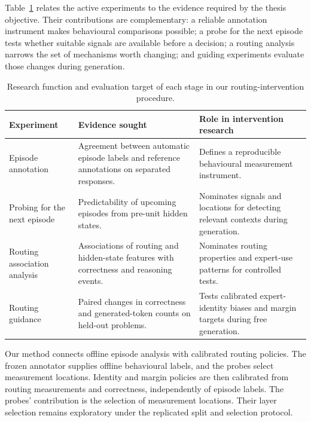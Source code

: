 \documentclass[12pt,a4paper,twoside,openright]{book}
\begin{document}
Table~\ref{tab:active-experiment-roles} relates the active experiments to the
evidence required by the thesis objective. Their contributions are
complementary: a reliable annotation instrument makes behavioural comparisons
possible; a probe for the next episode tests whether suitable signals are
available before a decision; a routing analysis narrows the set of mechanisms
worth changing; and guiding experiments evaluate those changes during generation.

\begin{table}[!ht]
  \centering
  \small
  \caption{Research function and evaluation target of each stage in our
  routing-intervention procedure.}
  \label{tab:active-experiment-roles}
  \begin{tabularx}{\textwidth}{@{}>{\raggedright\arraybackslash}p{}
    >{\raggedright\arraybackslash}X>{\raggedright\arraybackslash}X@{}}
    \toprule
    Experiment & Evidence sought & Role in intervention research \\
    \midrule
    Episode annotation & Agreement between automatic episode labels and
      reference annotations on separated responses. & Defines a reproducible
      behavioural measurement instrument. \\
    \addlinespace
    Probing for the next episode & Predictability of upcoming episodes from pre-unit
      hidden states. & Nominates signals and locations for detecting relevant
      contexts during generation. \\
    \addlinespace
    Routing association analysis & Associations of routing and hidden-state
      features with correctness and reasoning events. & Nominates routing
      properties and expert-use patterns for controlled tests. \\
    \addlinespace
    Routing guidance & Paired changes in correctness and generated-token
      counts on held-out problems. & Tests calibrated expert-identity biases
      and margin targets during free generation. \\
    \bottomrule
  \end{tabularx}
\end{table}

Our method connects offline episode analysis with calibrated routing policies.
The frozen annotator supplies offline behavioural labels, and the probes
select measurement locations. Identity and margin policies are then calibrated
from routing measurements and correctness, independently of episode labels.
The probes' contribution is the selection of measurement locations. Their
layer selection remains exploratory under the replicated split and selection
protocol.
\end{document}

